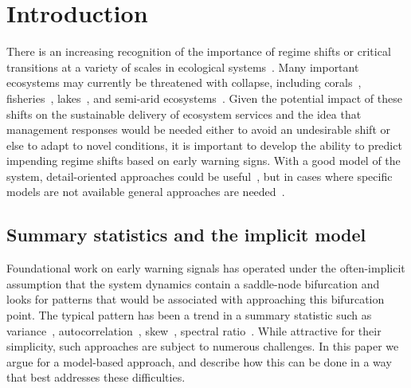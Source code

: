 \documentclass[authoryear,preprint,11pt]{elsarticle}
\begin{document}
\section{Introduction}
There is an increasing recognition of the importance of regime shifts or critical transitions at a variety of scales in ecological systems~\citep{Holling1973, Wissel1984, Scheffer2001, Scheffer2009, Drake2010, Carpenter2011}⁠. 
Many important ecosystems may currently be threatened with collapse, including corals~\citep{Bellwood2004}, fisheries~\citep{Berkes2006}⁠, lakes~\citep{Carpenter2011}, and semi-arid ecosystems~\citep{Kefi2007}⁠. 
Given the potential impact of  these shifts on the sustainable delivery of ecosystem services
and the idea that management responses would be needed either to avoid an undesirable shift or else to adapt to novel conditions,
it is important to develop the ability to predict impending regime shifts based on early warning signs. 
With a good model of the system, detail-oriented approaches could be useful~\citep{Lenton2009},
but in cases where specific models are not available general approaches are needed~\citep{Scheffer2009}⁠.



\subsection{Summary statistics and the implicit model}
Foundational work on early warning signals has operated under the often-implicit assumption %
that the system dynamics contain a saddle-node bifurcation and
looks for patterns that would be associated with approaching this bifurcation point.
The typical pattern has been a trend in a summary statistic such as
variance~\citep{Carpenter2006}, autocorrelation~\citep{Held2004, Dakos2008},
skew~\citep{Guttal2008}, spectral ratio~\citep{Biggs2009}.
While attractive for their simplicity, such approaches are subject to numerous challenges.
In this paper we argue for a model-based approach, 
and describe how this can be done in a way that best addresses these difficulties.
\end{document}
